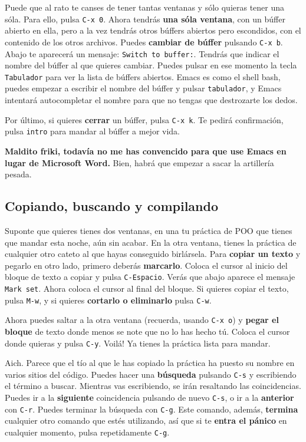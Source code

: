 \documentclass{article}
\begin{document}
Puede que al rato te canses de tener tantas ventanas y sólo quieras tener una sóla. Para ello, pulsa \texttt{C-x 0}. Ahora tendrás \textbf{una sóla ventana}, con un búffer abierto en ella, pero a la vez tendrás otros búffers abiertos pero escondidos, con el contenido de los otros archivos. Puedes \textbf{cambiar de búffer} pulsando \texttt{C-x b}. Abajo te aparecerá un mensaje: \texttt{Switch to buffer:}. Tendrás que indicar el nombre del búffer al que quieres cambiar. Puedes pulsar en ese momento la tecla \texttt{Tabulador} para ver la lista de búffers abiertos. Emacs es como el shell bash, puedes empezar a escribir el nombre del búffer y pulsar \texttt{tabulador}, y Emacs intentará autocompletar el nombre para que no tengas que destrozarte los dedos.

Por último, si quieres \textbf{cerrar} un búffer, pulsa \texttt{C-x k}. Te pedirá confirmación, pulsa \texttt{intro} para mandar al búffer a mejor vida.

\textbf{Maldito friki, todavía no me has convencido para que use Emacs en lugar de Microsoft Word.} Bien, habrá que empezar a sacar la artillería pesada.

\vfill
\pagebreak

\subsection*{Copiando, buscando y compilando}
\vspace{-0.4cm}
Suponte que quieres tienes dos ventanas, en una tu práctica de POO que tienes que mandar esta noche, aún sin acabar. En la otra ventana, tienes la práctica de cualquier otro cateto al que hayas conseguido birlársela. Para \textbf{copiar un texto} y pegarlo en otro lado, primero deberás \textbf{marcarlo}. Coloca el cursor al inicio del bloque de texto a copiar y pulsa \texttt{C-Espacio}. Verás que abajo aparece el mensaje \texttt{Mark set}. Ahora coloca el cursor al final del bloque. Si quieres copiar el texto, pulsa \texttt{M-w}, y si quieres \textbf{cortarlo o eliminarlo} pulsa \texttt{C-w}.

Ahora puedes saltar a la otra ventana (recuerda, usando \texttt{C-x o}) y \textbf{pegar el bloque} de texto donde menos se note que no lo has hecho tú. Coloca el cursor donde quieras y pulsa \texttt{C-y}. Voilá! Ya tienes la práctica lista para mandar.

Aich. Parece que el tío al que le has copiado la práctica ha puesto su nombre en varios sitios del código. Puedes hacer una \textbf{búsqueda} pulsando \texttt{C-s} y escribiendo el término a buscar. Mientras vas escribiendo, se irán resaltando las coincidencias. Puedes ir a la \textbf{siguiente} coincidencia pulsando de nuevo \texttt{C-s}, o ir a la \textbf{anterior} con \texttt{C-r}. Puedes terminar la búsqueda con \texttt{C-g}. Este comando, además, \textbf{termina} cualquier otro comando que estés utilizando, así que si te \textbf{entra el pánico} en cualquier momento, pulsa repetidamente \texttt{C-g}.
\end{document}
